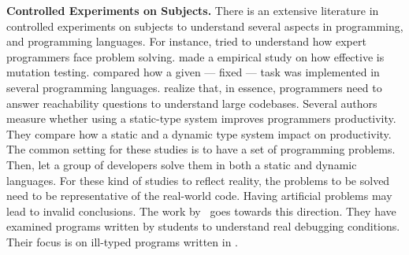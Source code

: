 \textbf{Controlled Experiments on Subjects.}
There is an extensive literature \perse{} in controlled experiments on subjects to understand several aspects in programming, and programming languages.
For instance, \cite{solowayEmpiricalStudiesProgramming1984} tried to understand how expert programmers face problem solving.
\cite{buddTheoreticalEmpiricalStudies1980} made a empirical study on how effective is mutation testing.
\cite{precheltEmpiricalComparisonSeven2000} compared how a given --- fixed --- task was implemented in several programming languages.
%
\cite{latozaDevelopersAskReachability2010} realize that, in essence, programmers need to answer reachability questions to understand large codebases.
%
Several authors~\cite{stuchlikStaticVsDynamic2011,mayerEmpiricalStudyInfluence2012,harlinImpactUsingStaticType2017} measure whether using a static-type system improves programmers productivity.
They compare how a static and a dynamic type system impact on productivity.
The common setting for these studies is to have a set of programming problems.
Then, let a group of developers solve them in both a static and dynamic languages.
%
For these kind of studies to reflect reality, the problems to be solved need to be representative of the real-world code.
Having artificial problems may lead to invalid conclusions.
The work by~\cite{wuHowTypeErrors2017,wuLearningUserFriendly2017} goes towards this direction. 
They have examined programs written by students to understand real debugging conditions. 
Their focus is on ill-typed programs written in \haskell{}.

